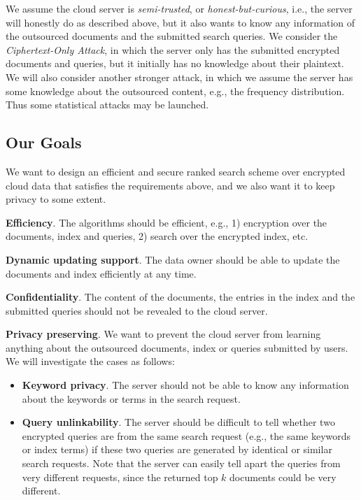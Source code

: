 \documentclass{article}
\begin{document}
We assume the cloud server is \emph{semi-trusted}, or \emph{honest-but-curious}, i.e., the server will honestly do as described above, but it also wants to know any information of the outsourced documents and the submitted search queries. We consider the \emph{Ciphertext-Only Attack}, in which the server only has the submitted encrypted documents and queries, but it initially has no knowledge about their plaintext. We will also consider another stronger attack, in which we assume the server has some knowledge about the outsourced content, e.g., the frequency distribution. Thus some statistical attacks may be launched.

\subsection{Our Goals}
We want to design an efficient and secure ranked search scheme over encrypted cloud data that satisfies the requirements above, and we also want it to keep privacy to some extent.

\textbf{Efficiency}. The algorithms should be efficient, e.g., 1) encryption over the documents, index and queries, 2) search over the encrypted index, etc.

\textbf{Dynamic updating support}. The data owner should be able to update the documents and index efficiently at any time.

\textbf{Confidentiality}. The content of the documents, the entries in the index and the submitted queries should not be revealed to the cloud server.

\textbf{Privacy preserving}. We want to prevent the cloud server from learning anything about the outsourced documents, index or queries submitted by users. We will investigate the cases as follows:
\begin{itemize}
\item \textbf{Keyword privacy}. The server should not be able to know any information about the keywords or terms in the search request.
\item \textbf{Query unlinkability}. The server should be difficult to tell whether two encrypted queries are from the same search request (e.g., the same keywords or index terms) if these two queries are generated by identical or similar search requests. Note that the server can easily tell apart the queries from very different requests, since the returned top $k$ documents could be very different.
\end{itemize}
\end{document}
